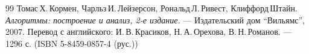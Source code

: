 \begin{thebibliography}{99}
Томас\,Х.\,Кормен, Чарльз\,И.\,Лейзерсон, Рональд\,Л.\,Ривест, Клиффорд\,Штайн.
{\itshape Алгоритмы: построение и анализ, 2-е издание.} --- Издательский дом \enquote{Вильямс}, 2007. Перевод с английского: И.\,В.\,Красиков, Н.\,А.\,Орехова, В.\,Н.\,Романов. --- 1296 с. (ISBN 5-8459-0857-4 (рус.))
\end{thebibliography}
\pagebreak


